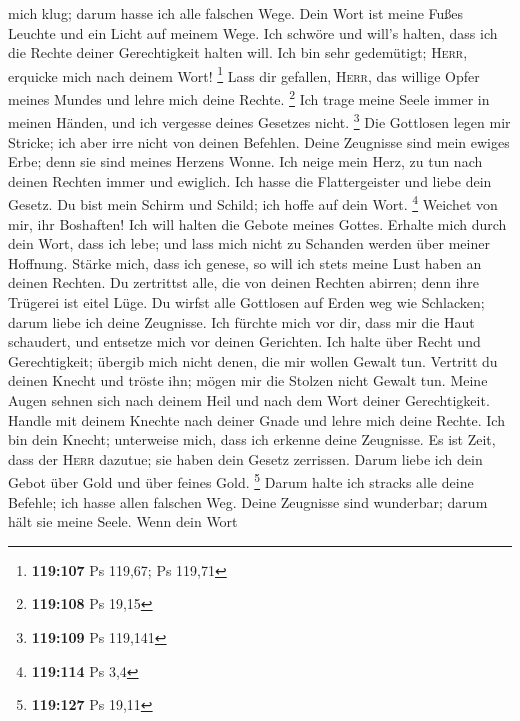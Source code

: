 mich klug; darum hasse ich alle falschen Wege.  Dein
Wort ist meine Fußes Leuchte und ein Licht auf meinem Wege.
 Ich schwöre und will's halten, dass ich die Rechte
deiner Gerechtigkeit halten will.  Ich bin sehr
gedemütigt; \textsc{Herr}, erquicke mich nach deinem Wort! \footnote{\textbf{119:107}
  Ps 119,67; Ps 119,71}  Lass dir gefallen,
\textsc{Herr}, das willige Opfer meines Mundes und lehre mich deine
Rechte. \footnote{\textbf{119:108} Ps 19,15}  Ich trage
meine Seele immer in meinen Händen, und ich vergesse deines Gesetzes
nicht. \footnote{\textbf{119:109} Ps 119,141}  Die
Gottlosen legen mir Stricke; ich aber irre nicht von deinen Befehlen.
 Deine Zeugnisse sind mein ewiges Erbe; denn sie sind
meines Herzens Wonne.  Ich neige mein Herz, zu tun nach
deinen Rechten immer und ewiglich.  Ich hasse die
Flattergeister und liebe dein Gesetz.  Du bist mein
Schirm und Schild; ich hoffe auf dein Wort. \footnote{\textbf{119:114}
  Ps 3,4}  Weichet von mir, ihr Boshaften! Ich will
halten die Gebote meines Gottes.  Erhalte mich durch
dein Wort, dass ich lebe; und lass mich nicht zu Schanden werden über
meiner Hoffnung.  Stärke mich, dass ich genese, so will
ich stets meine Lust haben an deinen Rechten.  Du
zertrittst alle, die von deinen Rechten abirren; denn ihre Trügerei ist
eitel Lüge.  Du wirfst alle Gottlosen auf Erden weg wie
Schlacken; darum liebe ich deine Zeugnisse.  Ich fürchte
mich vor dir, dass mir die Haut schaudert, und entsetze mich vor deinen
Gerichten.  Ich halte über Recht und Gerechtigkeit;
übergib mich nicht denen, die mir wollen Gewalt tun. 
Vertritt du deinen Knecht und tröste ihn; mögen mir die Stolzen nicht
Gewalt tun.  Meine Augen sehnen sich nach deinem Heil
und nach dem Wort deiner Gerechtigkeit.  Handle mit
deinem Knechte nach deiner Gnade und lehre mich deine Rechte.
 Ich bin dein Knecht; unterweise mich, dass ich erkenne
deine Zeugnisse.  Es ist Zeit, dass der \textsc{Herr}
dazutue; sie haben dein Gesetz zerrissen.  Darum liebe
ich dein Gebot über Gold und über feines Gold. \footnote{\textbf{119:127}
  Ps 19,11}  Darum halte ich stracks alle deine Befehle;
ich hasse allen falschen Weg.  Deine Zeugnisse sind
wunderbar; darum hält sie meine Seele.  Wenn dein Wort
